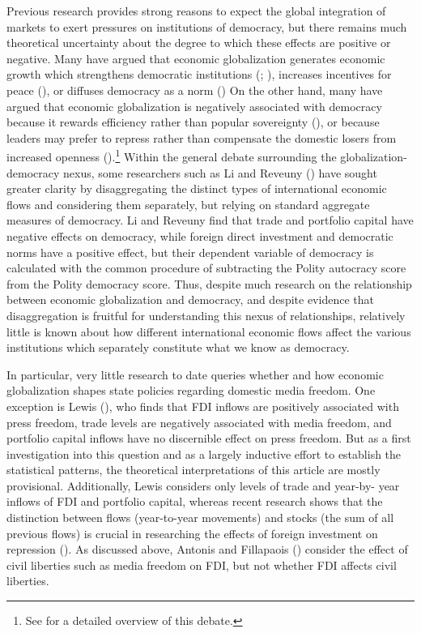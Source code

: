 \documentclass[12pt]{report}
\begin{document}
Previous research provides strong reasons to expect the global integration of markets to exert
pressures on institutions of democracy, but there remains much theoretical uncertainty about the
degree to which these effects are positive or negative. Many have argued that economic globalization
generates economic growth which strengthens democratic institutions (\citealt{Baghwati:1997vy};
\citealt{Im:1996cl}), increases incentives for peace (\citealt{Baghwati:1997vy,Oneal:1999fc}), or
diffuses democracy as a norm (\citealt{Kant:1983uf,Limongi:1996dr}) On the other hand, many have
argued that economic globalization is negatively associated with democracy because it rewards
efficiency rather than popular sovereignty
(\citealt{Huntington:1975vt,Lindblom:1977ue,Cammack:1998gf}), or because leaders may prefer to
repress rather than compensate the domestic losers from increased openness
(\citealt{Adsera:2002vt}).\footnote{See \citealt{Li:2003vj} for a detailed overview of this debate.%
} Within the general debate surrounding the globalization-democracy nexus, some researchers such as
Li and Reveuny (\citeyear{Li:2003vj}) have sought greater clarity by disaggregating the distinct
types of international economic flows and considering them separately, but relying on standard
aggregate measures of democracy. Li and Reveuny find that trade and portfolio capital have negative
effects on democracy, while foreign direct investment and democratic norms have a positive effect,
but their dependent variable of democracy is calculated with the common procedure of subtracting the
Polity autocracy score from the Polity democracy score. Thus, despite much research on the
relationship between economic globalization and democracy, and despite evidence that disaggregation
is fruitful for understanding this nexus of relationships, relatively little is known about how
different international economic flows affect the various institutions which separately constitute
what we know as democracy.

In particular, very little research to date queries whether and how economic globalization shapes
state policies regarding domestic media freedom. One exception is Lewis
(\citeyear{Lewis:qDvYbWlU}), who finds that FDI inflows are positively associated with press
freedom, trade levels are negatively associated with media freedom, and portfolio capital inflows
have no discernible effect on press freedom. But as a first investigation into this question and as
a largely inductive effort to establish the statistical patterns, the theoretical interpretations of
this article are mostly provisional. Additionally, Lewis considers only levels of trade and year-by-
year inflows of FDI and portfolio capital, whereas recent research shows that the distinction
between flows (year-to-year movements) and stocks (the sum of all previous flows) is crucial in
researching the effects of foreign investment on repression (\citeyear{Sorens:2012hc}). As discussed
above, Antonis and Fillapaois (\citeyear{Adam:2007gn}) consider the effect of civil liberties such
as media freedom on FDI, but not whether FDI affects civil liberties.
\end{document}
